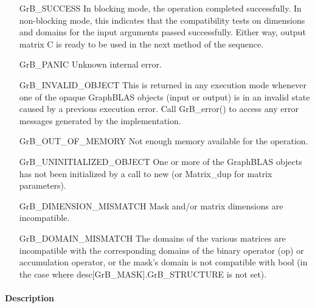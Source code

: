 \begin{itemize}[leftmargin=2.1in]
    \item[{\sf GrB\_SUCCESS}]         In blocking mode, the operation completed
    successfully. In non-blocking mode, this indicates that the compatibility 
    tests on dimensions and domains for the input arguments passed successfully. 
    Either way, output matrix {\sf C} is ready to be used in the next method of
    the sequence.

    \item[{\sf GrB\_PANIC}]           Unknown internal error.

    \item[{\sf GrB\_INVALID\_OBJECT}] This is returned in any execution mode 
    whenever one of the opaque GraphBLAS objects (input or output) is in an invalid 
    state caused by a previous execution error.  Call {\sf GrB\_error()} to access 
    any error messages generated by the implementation.

    \item[{\sf GrB\_OUT\_OF\_MEMORY}] Not enough memory available for the operation.

    \item[{\sf GrB\_UNINITIALIZED\_OBJECT}] One or more of the GraphBLAS objects 
    has not been initialized by a call to {\sf new} (or {\sf Matrix\_dup} for matrix
    parameters).

    \item[{\sf GrB\_DIMENSION\_MISMATCH}] Mask and/or matrix
    dimensions are incompatible.

    \item[{\sf GrB\_DOMAIN\_MISMATCH}]    The domains of the various matrices are
    incompatible with the corresponding domains of the binary operator ({\sf op}) or
    accumulation operator, or the mask's domain is not compatible with {\sf bool}
    (in the case where {\sf desc[GrB\_MASK].GrB\_STRUCTURE} is not set).
\end{itemize}

\paragraph{Description}

